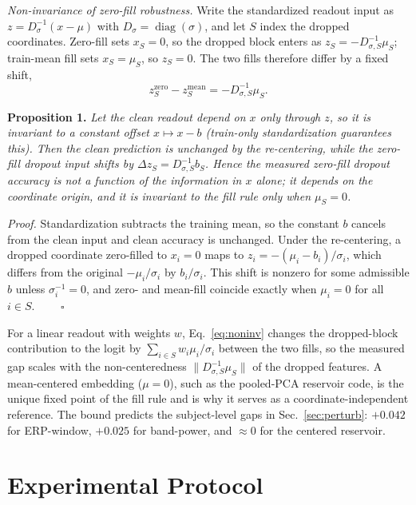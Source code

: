\documentclass[conference]{IEEEtran}
\begin{document}
\emph{Non-invariance of zero-fill robustness.} Write the standardized readout input as $z=D_\sigma^{-1}(x-\mu)$ with $D_\sigma=\operatorname{diag}(\sigma)$, and let $S$ index the dropped coordinates. Zero-fill sets $x_S=0$, so the dropped block enters as $z_S=-D_{\sigma,S}^{-1}\mu_S$; train-mean fill sets $x_S=\mu_S$, so $z_S=0$. The two fills therefore differ by a fixed shift,
\begin{equation}\label{eq:noninv}
z_S^{\mathrm{zero}}-z_S^{\mathrm{mean}}=-D_{\sigma,S}^{-1}\mu_S .
\end{equation}

\noindent\textbf{Proposition 1.} \emph{Let the clean readout depend on $x$ only through $z$, so it is invariant to a constant offset $x\mapsto x-b$ (train-only standardization guarantees this). Then the clean prediction is unchanged by the re-centering, while the zero-fill dropout input shifts by $\Delta z_S=D_{\sigma,S}^{-1}b_S$. Hence the measured zero-fill dropout accuracy is not a function of the information in $x$ alone; it depends on the coordinate origin, and it is invariant to the fill rule only when $\mu_S=0$.}

\noindent\emph{Proof.} Standardization subtracts the training mean, so the constant $b$ cancels from the clean input and clean accuracy is unchanged. Under the re-centering, a dropped coordinate zero-filled to $x_i=0$ maps to $z_i=-(\mu_i-b_i)/\sigma_i$, which differs from the original $-\mu_i/\sigma_i$ by $b_i/\sigma_i$. This shift is nonzero for some admissible $b$ unless $\sigma_i^{-1}=0$, and zero- and mean-fill coincide exactly when $\mu_i=0$ for all $i\in S$. $\qquad\square$

For a linear readout with weights $w$, Eq.~\eqref{eq:noninv} changes the dropped-block contribution to the logit by $\sum_{i\in S} w_i\mu_i/\sigma_i$ between the two fills, so the measured gap scales with the non-centeredness $\lVert D_{\sigma,S}^{-1}\mu_S\rVert$ of the dropped features. A mean-centered embedding ($\mu=0$), such as the pooled-PCA reservoir code, is the unique fixed point of the fill rule and is why it serves as a coordinate-independent reference. The bound predicts the subject-level gaps in Sec.~\ref{sec:perturb}: $+0.042$ for ERP-window, $+0.025$ for band-power, and $\approx 0$ for the centered reservoir.

\section{Experimental Protocol}
\end{document}

